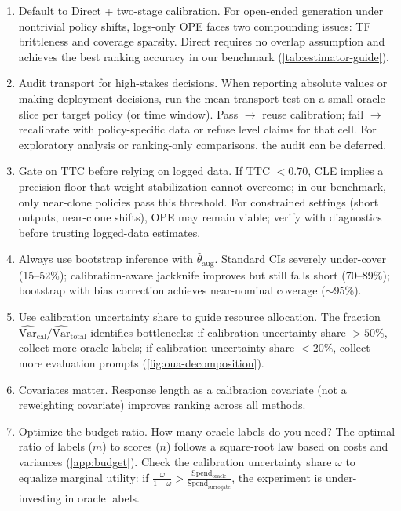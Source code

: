 \begin{enumerate}[leftmargin=*,itemsep=2pt,topsep=2pt]
\item Default to Direct + two-stage calibration. For open-ended generation under nontrivial policy shifts, logs-only OPE faces two compounding issues: TF brittleness and coverage sparsity. Direct requires no overlap assumption and achieves the best ranking accuracy in our benchmark (\cref{tab:estimator-guide}).
\item Audit transport for high-stakes decisions. When reporting absolute values or making deployment decisions, run the mean transport test on a small oracle slice per target policy (or time window). Pass $\to$ reuse calibration; fail $\to$ recalibrate with policy-specific data or refuse level claims for that cell. For exploratory analysis or ranking-only comparisons, the audit can be deferred.
\item Gate on TTC before relying on logged data. If TTC $< 0.70$, CLE implies a precision floor that weight stabilization cannot overcome; in our benchmark, only near-clone policies pass this threshold. For constrained settings (short outputs, near-clone shifts), OPE may remain viable; verify with diagnostics before trusting logged-data estimates.
\item Always use bootstrap inference with $\hat\theta_{\mathrm{aug}}$. Standard CIs severely under-cover (15--52\%); calibration-aware jackknife improves but still falls short (70--89\%); bootstrap with bias correction achieves near-nominal coverage (${\sim}$95\%).
\item Use calibration uncertainty share to guide resource allocation. The fraction $\widehat{\mathrm{Var}}_{\mathrm{cal}} / \widehat{\mathrm{Var}}_{\mathrm{total}}$ identifies bottlenecks: if calibration uncertainty share $> 50\%$, collect more oracle labels; if calibration uncertainty share $< 20\%$, collect more evaluation prompts (\cref{fig:oua-decomposition}).
\item Covariates matter. Response length as a calibration covariate (not a reweighting covariate) improves ranking across all methods.
\item Optimize the budget ratio. How many oracle labels do you need? The optimal ratio of labels ($m$) to scores ($n$) follows a square-root law based on costs and variances (\cref{app:budget}). Check the calibration uncertainty share $\omega$ to equalize marginal utility: if $\frac{\omega}{1-\omega} > \frac{\mathrm{Spend}_{\mathrm{oracle}}}{\mathrm{Spend}_{\mathrm{surrogate}}}$, the experiment is under-investing in oracle labels.
\end{enumerate}
